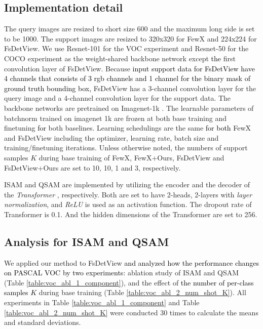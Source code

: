 \documentclass[10pt,twocolumn,letterpaper]{article}
\newcommand{\nj}[1]{\textcolor{black}{#1}}
\begin{document}
\subsection{Implementation detail}
\label{subsec:imple}
The query images are resized to short size 600 and the maximum long side is set to be 1000. The support images are resized to 320x320 for FewX and 224x224 for FsDetView. We use Resnet-101 \cite{he2016deep} for the VOC experiment and Resnet-50 for the COCO experiment as the weight-shared backbone network except \nj{the} first convolution layer of FsDetView. Because \nj{input support data for FsDetView have 4 channels that consists of 3 rgb channels and 1 channel for the binary mask of ground truth bounding box,} FsDetView has a 3-channel convolution layer for the query image and a 4-channel convolution layer for the support data. The backbone networks are pretrained on Imagenet-1k \cite{ILSVRC15}. The learnable parameters of batchnorm \cite{ioffe2015batch} trained on imagenet 1k are frozen at both base training and finetuning \nj{for} both baselines. Learning schedulings are the same \nj{for both} FewX and FsDetView including the optimizer, learning rate, batch size and training/finetuning iterations. Unless otherwise noted, the numbers of support samples $K$ during base training of FewX, FewX+Ours, FsDetView and FsDetView+Ours are set to 10, 10, 1 and 3\footnotemark, respectively.  

ISAM and QSAM are implemented by utilizing the encoder and the decoder of the \textit{Transformer} \cite{vaswani2017attention}, respectively. Both are set to have 2-heads, 2-layers with \textit{layer normalization}, and \textit{ReLU} is used as an activation function. The dropout \cite{srivastava2014dropout} rate of Transformer is 0.1. And the hidden dimensions of the Transformer are set to 256.



\subsection{Analysis for ISAM and QSAM}
\label{subsec:ablation}
We applied our method to FsDetView \cite{xiao2020few} \nj{and analyzed how the performance changes on PASCAL VOC by two experiments}: ablation study of ISAM and QSAM (Table \ref{table:voc_abl_1_component}), and the effect of \nj{the number of per-class samples $K$} during base training (Table \ref{table:voc_abl_2_num_shot_K}). All experiments in Table \ref{table:voc_abl_1_component} and Table \ref{table:voc_abl_2_num_shot_K} were conducted 30 times to calculate the means and standard deviations.
\end{document}
